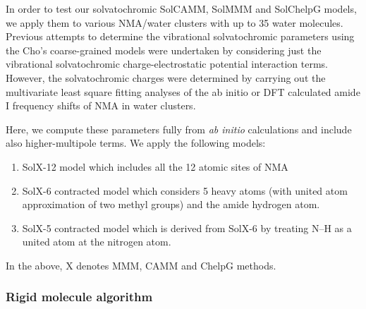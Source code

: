 \documentclass[a4paper,titlepage,twoside,fleqn,12pt]{book}
\begin{document}
\begin{refsection}
In order to test our solvatochromic SolCAMM, SolMMM and SolChelpG models,
we apply them to various NMA/water clusters
with up to 35 water molecules. Previous attempts \citep{Lee.Choi.Cho.JCP.2012}
to determine the vibrational solvatochromic parameters using the Cho's
coarse\hyp{}grained models were undertaken by considering just the 
vibrational solvatochromic charge\hyp{}electrostatic potential
interaction terms. However, the solvatochromic charges
were determined by carrying out the multivariate
least square fitting analyses of the ab initio or DFT calculated
amide I frequency shifts of NMA in water clusters. 

Here, we compute these
parameters fully from \emph{ab initio} calculations and include also 
higher\hyp{}multipole terms. We apply the following models:
%
\begin{enumerate}
 \item SolX-12 model which includes all the 12 atomic sites of NMA
 \item SolX-6 contracted model which considers 5 heavy atoms (with united
       atom approximation of two methyl groups) and the
       amide hydrogen atom.
 \item SolX-5 contracted model which is derived from SolX-6 by treating N--H
       as a united atom at the nitrogen atom.
\end{enumerate}
%
In the above, X denotes MMM, CAMM and ChelpG methods. 

\subsubsection{Rigid molecule algorithm\label{s:rigid-molecule-algorithm}}


\end{refsection}
\end{document}
